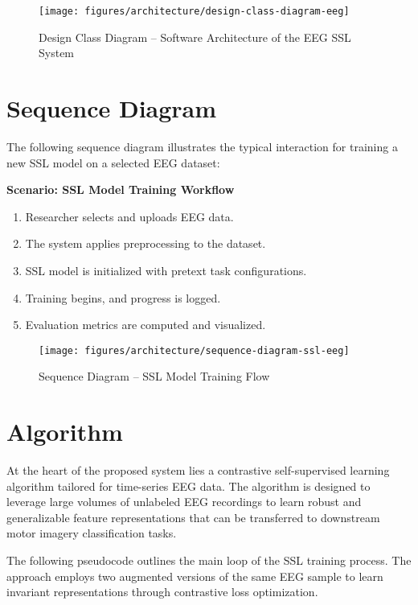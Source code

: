 \begin{figure}[h!]
    \centering
    \texttt{[image: figures/architecture/design-class-diagram-eeg]}
    \caption{Design Class Diagram – Software Architecture of the EEG SSL System}
    \label{fig:design-class}
\end{figure}


\section{Sequence Diagram}
\label{sec:sequence-diagram}

The following sequence diagram illustrates the typical interaction for training a new SSL model on a selected EEG dataset:

\textbf{Scenario: SSL Model Training Workflow}
\begin{enumerate}
    \item Researcher selects and uploads EEG data.
    \item The system applies preprocessing to the dataset.
    \item SSL model is initialized with pretext task configurations.
    \item Training begins, and progress is logged.
    \item Evaluation metrics are computed and visualized.
\end{enumerate}

\begin{figure}[h]
    \centering
    \texttt{[image: figures/architecture/sequence-diagram-ssl-eeg]}
    \caption{Sequence Diagram – SSL Model Training Flow}
    \label{fig:figure8}
\end{figure}
\newpage


\section{Algorithm}
\label{sec:algorithm}

At the heart of the proposed system lies a contrastive self-supervised learning algorithm tailored for time-series EEG data. The algorithm is designed to leverage large volumes of unlabeled EEG recordings to learn robust and generalizable feature representations that can be transferred to downstream motor imagery classification tasks.

The following pseudocode outlines the main loop of the SSL training process. The approach employs two augmented versions of the same EEG sample to learn invariant representations through contrastive loss optimization.

